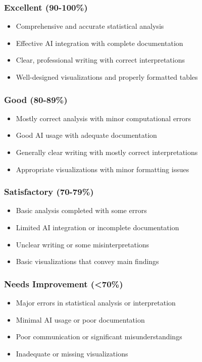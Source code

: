 \documentclass[11pt]{article}
\begin{document}
\subsubsection{Excellent (90-100\%)}
\begin{itemize}
\item Comprehensive and accurate statistical analysis
\item Effective AI integration with complete documentation
\item Clear, professional writing with correct interpretations
\item Well-designed visualizations and properly formatted tables
\end{itemize}

\subsubsection{Good (80-89\%)}
\begin{itemize}
\item Mostly correct analysis with minor computational errors
\item Good AI usage with adequate documentation
\item Generally clear writing with mostly correct interpretations
\item Appropriate visualizations with minor formatting issues
\end{itemize}

\subsubsection{Satisfactory (70-79\%)}
\begin{itemize}
\item Basic analysis completed with some errors
\item Limited AI integration or incomplete documentation
\item Unclear writing or some misinterpretations
\item Basic visualizations that convey main findings
\end{itemize}

\subsubsection{Needs Improvement (<70\%)}
\begin{itemize}
\item Major errors in statistical analysis or interpretation
\item Minimal AI usage or poor documentation
\item Poor communication or significant misunderstandings
\item Inadequate or missing visualizations
\end{itemize}
\end{document}
